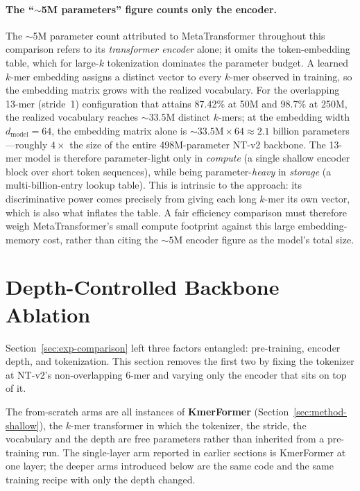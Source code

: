 \paragraph{The ``$\sim$5M parameters'' figure counts only the encoder.}
The $\sim$5M parameter count attributed to MetaTransformer throughout this comparison refers to its \emph{transformer encoder} alone; it omits the token-embedding table, which for large-$k$ tokenization dominates the parameter budget. A learned $k$-mer embedding assigns a distinct vector to every $k$-mer observed in training, so the embedding matrix grows with the realized vocabulary. For the overlapping 13-mer (stride~1) configuration that attains 87.42\% at 50M and 98.7\% at 250M, the realized vocabulary reaches ${\sim}33.5$M distinct $k$-mers; at the embedding width $d_{\text{model}}{=}64$, the embedding matrix alone is ${\sim}33.5\text{M}\times 64 \approx 2.1$ billion parameters---roughly $4\times$ the size of the entire 498M-parameter NT-v2 backbone. The 13-mer model is therefore parameter-light only in \emph{compute} (a single shallow encoder block over short token sequences), while being parameter-\emph{heavy} in \emph{storage} (a multi-billion-entry lookup table). This is intrinsic to the approach: its discriminative power comes precisely from giving each long $k$-mer its own vector, which is also what inflates the table. A fair efficiency comparison must therefore weigh MetaTransformer's small compute footprint against this large embedding-memory cost, rather than citing the ${\sim}5$M encoder figure as the model's total size.

\section{Depth-Controlled Backbone Ablation}
\label{sec:exp-shallow}

Section~\ref{sec:exp-comparison} left three factors entangled: pre-training, encoder depth, and tokenization. This section removes the first two by fixing the tokenizer at NT-v2's non-overlapping 6-mer and varying only the encoder that sits on top of it.

The from-scratch arms are all instances of \textbf{KmerFormer} (Section~\ref{sec:method-shallow}), the $k$-mer transformer in which the tokenizer, the stride, the vocabulary and the depth are free parameters rather than inherited from a pre-training run. The single-layer arm reported in earlier sections is KmerFormer at one layer; the deeper arms introduced below are the same code and the same training recipe with only the depth changed.

